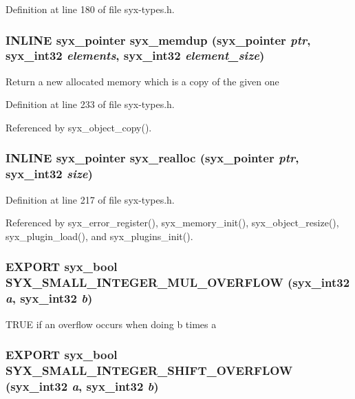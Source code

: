 Definition at line 180 of file syx-types.h.\hypertarget{syx-types_8h_47f29ccdb2ad4cdc7664fcc6ecaf2519}{
\subsubsection{\setlength{\rightskip}{0pt plus 5cm}INLINE {\bf syx\_\-pointer} syx\_\-memdup ({\bf syx\_\-pointer} {\em ptr}, \/  {\bf syx\_\-int32} {\em elements}, \/  {\bf syx\_\-int32} {\em element\_\-size})}}
\label{syx-types_8h_47f29ccdb2ad4cdc7664fcc6ecaf2519}


Return a new allocated memory which is a copy of the given one 

Definition at line 233 of file syx-types.h.

Referenced by syx\_\-object\_\-copy().\hypertarget{syx-types_8h_ee5c4c5cdd6c2b10174a78548375f1fe}{
\subsubsection{\setlength{\rightskip}{0pt plus 5cm}INLINE {\bf syx\_\-pointer} syx\_\-realloc ({\bf syx\_\-pointer} {\em ptr}, \/  {\bf syx\_\-int32} {\em size})}}
\label{syx-types_8h_ee5c4c5cdd6c2b10174a78548375f1fe}




Definition at line 217 of file syx-types.h.

Referenced by syx\_\-error\_\-register(), syx\_\-memory\_\-init(), syx\_\-object\_\-resize(), syx\_\-plugin\_\-load(), and syx\_\-plugins\_\-init().\hypertarget{syx-types_8h_22b049e1ad0335e6870a1dbb7376980d}{
\subsubsection{\setlength{\rightskip}{0pt plus 5cm}EXPORT {\bf syx\_\-bool} SYX\_\-SMALL\_\-INTEGER\_\-MUL\_\-OVERFLOW ({\bf syx\_\-int32} {\em a}, \/  {\bf syx\_\-int32} {\em b})}}
\label{syx-types_8h_22b049e1ad0335e6870a1dbb7376980d}


TRUE if an overflow occurs when doing b times a \hypertarget{syx-types_8h_a74d34881c9ff57dcaee88b24a2868fb}{
\subsubsection{\setlength{\rightskip}{0pt plus 5cm}EXPORT {\bf syx\_\-bool} SYX\_\-SMALL\_\-INTEGER\_\-SHIFT\_\-OVERFLOW ({\bf syx\_\-int32} {\em a}, \/  {\bf syx\_\-int32} {\em b})}}
\label{syx-types_8h_a74d34881c9ff57dcaee88b24a2868fb}


